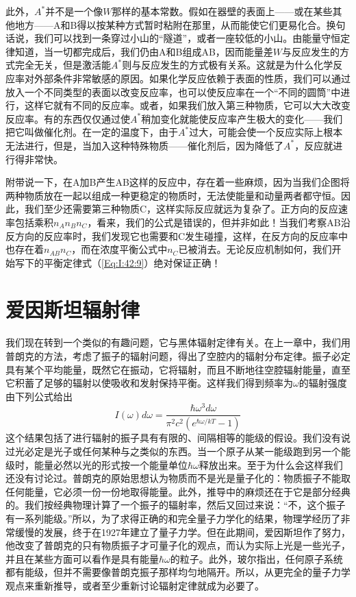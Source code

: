 此外，$A^*$并不是一个像$W$那样的基本常数。假如在器壁的表面上——或在某些其他地方——A和B得以按某种方式暂时粘附在那里，从而能使它们更易化合。换句话说，我们可以找到一条穿过小山的“隧道”，或者一座较低的小山。由能量守恒定律知道，当一切都完成后，我们仍由A和B组成AB，因而能量差$W$与反应发生的方式完全无关，但是激活能$A^*$则与反应发生的方式极有关系。这就是为什么化学反应率对外部条件非常敏感的原因。如果化学反应依赖于表面的性质，我们可以通过放入一个不同类型的表面以改变反应率，也可以使反应率在一个“不同的圆筒”中进行，这样它就有不同的反应率。或者，如果我们放入第三种物质，它可以大大改变反应率。有的东西仅仅通过使$A^*$稍加变化就能使反应率产生极大的变化——我们把它叫做催化剂。在一定的温度下，由于$A^*$过大，可能会使一个反应实际上根本无法进行，但是，当加入这种特殊物质——催化剂后，因为降低了$A^*$，反应就进行得非常快。

附带说一下，在A加B产生AB这样的反应中，存在着一些麻烦，因为当我们企图将两种物质放在一起以组成一种更稳定的物质时，无法使能量和动量两者都守恒。因此，我们至少还需要第三种物质C，这样实际反应就远为复杂了。正方向的反应速率包括乘积$n_A n_B n_C$，看来，我们的公式是错误的，但并非如此！当我们考察AB沿反方向的反应率时，我们发现它也需要和C发生碰撞，这样，在反方向的反应率中也存在着$n_{AB}n_C$，而在浓度平衡公式中$n_C$已被消去。无论反应机制如何，我们开始写下的平衡定律式（\ref{Eq:I:42:9}）绝对保证正确！

\section{爱因斯坦辐射律}

我们现在转到一个类似的有趣问题，它与黑体辐射定律有关。在上一章中，我们用普朗克的方法，考虑了振子的辐射问题，得出了空腔内的辐射分布定律。振子必定具有某个平均能量，既然它在振动，它将辐射，而且不断地往空腔辐射能量，直至它积蓄了足够的辐射以使吸收和发射保持平衡。这样我们得到频率为$\omega$的辐射强度由下列公式给出
\begin{equation}
    \label{Eq:I:42:12}
    I(\omega)d\omega = \frac{\hbar\omega^3d\omega}{\pi^2c^2(e^{\hbar\omega/kT}-1)}
\end{equation}
这个结果包括了进行辐射的振子具有有限的、间隔相等的能级的假设。我们没有说过光必定是光子或任何某种与之类似的东西。当一个原子从某一能级跑到另一个能级时，能量必然以光的形式按一个能量单位$\hbar\omega$释放出来。至于为什么会这样我们还没有讨论过。普朗克的原始思想认为物质而不是光是量子化的：物质振子不能取任何能量，它必须一份一份地取得能量。此外，推导中的麻烦还在于它是部分经典的。我们按经典物理计算了一个振子的辐射率，然后又回过来说：“不，这个振子有一系列能级。”所以，为了求得正确的和完全量子力学化的结果，物理学经历了非常缓慢的发展，终于在1927年建立了量子力学。但在此期间，爱因斯坦作了努力，他改变了普朗克的只有物质振子才可量子化的观点，而认为实际上光是一些光子，并且在某些方面可以看作是具有能量$\hbar\omega$的粒子。此外，玻尔指出，任何原子系统都有能级，但并不需要像普朗克振子那样均匀地隔开。所以，从更完全的量子力学观点来重新推导，或者至少重新讨论辐射定律就成为必要了。

